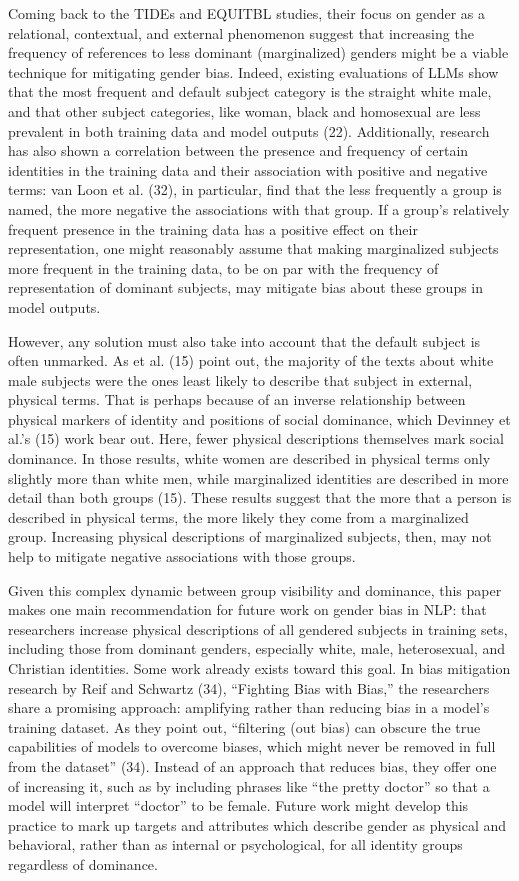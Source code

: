 \documentclass[11pt]{article}
\begin{document}
Coming back to the TIDEs and EQUITBL studies, their focus on gender as a relational, contextual, and external phenomenon suggest that increasing the frequency of references to less dominant (marginalized) genders might be a viable technique for mitigating gender bias. Indeed, existing evaluations of LLMs show that the most frequent and default subject category is the straight white male, and that other subject categories, like woman, black and homosexual are less prevalent in both training data and model outputs (22). Additionally, research has also shown a correlation between the presence and frequency of certain identities in the training data and their association with positive and negative terms: van Loon et al. (32), in particular, find that the less frequently a group is named, the more negative the associations with that group. If a group’s relatively frequent presence in the training data has a positive effect on their representation, one might reasonably assume that making marginalized subjects more frequent in the training data, to be on par with the frequency of representation of dominant subjects, may mitigate bias about these groups in model outputs. 

However, any solution must also take into account that the default subject is often unmarked. As et al. (15) point out, the majority of the texts about white male subjects were the ones least likely to describe that subject in external, physical terms. That is perhaps because of an inverse relationship between physical markers of identity and positions of social dominance, which Devinney et al.’s (15) work bear out. Here, fewer physical descriptions themselves mark social dominance. In those results, white women are described in physical terms only slightly more than white men, while marginalized identities are described in more detail than both groups (15). These results suggest that the more that a person is described in physical terms, the more likely they come from a marginalized group. Increasing physical descriptions of marginalized subjects, then, may not help to mitigate negative associations with those groups. 

Given this complex dynamic between group visibility and dominance, this paper makes one main recommendation for future work on gender bias in NLP: that researchers increase physical descriptions of all gendered subjects in training sets, including those from dominant genders, especially white, male, heterosexual, and Christian identities. Some work already exists toward this goal. In bias mitigation research by Reif and Schwartz (34), “Fighting Bias with Bias,” the researchers share a promising approach: amplifying rather than reducing bias in a model’s training dataset. As they point out, “filtering (out bias) can obscure the true capabilities of models to overcome biases, which might never be removed in full from the dataset” (34). Instead of an approach that reduces bias, they offer one of increasing it, such as by including phrases like “the pretty doctor” so that a model will interpret “doctor” to be female. Future work might develop this practice to mark up targets and attributes which describe gender as physical and behavioral, rather than as internal or psychological, for all identity groups regardless of dominance.
\end{document}
